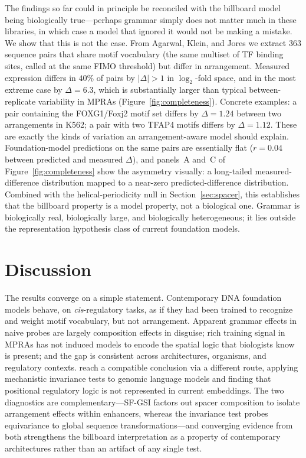 \documentclass{article}
\begin{document}
The findings so far could in principle be reconciled with the billboard model being biologically true---perhaps grammar simply does not matter much in these libraries, in which case a model that ignored it would not be making a mistake. We show that this is not the case. From Agarwal, Klein, and Jores we extract $363$ sequence pairs that share motif vocabulary (the same multiset of TF binding sites, called at the same FIMO threshold) but differ in arrangement. Measured expression differs in $40\%$ of pairs by $|\Delta| > 1$ in $\log_2$-fold space, and in the most extreme case by $\Delta = 6.3$, which is substantially larger than typical between-replicate variability in MPRAs (Figure~\ref{fig:completeness}). Concrete examples: a pair containing the FOXG1/Foxj2 motif set differs by $\Delta = 1.24$ between two arrangements in K562; a pair with two TFAP4 motifs differs by $\Delta = 1.12$. These are exactly the kinds of variation an arrangement-aware model should explain. Foundation-model predictions on the same pairs are essentially flat ($r = 0.04$ between predicted and measured $\Delta$), and panels~A and~C of Figure~\ref{fig:completeness} show the asymmetry visually: a long-tailed measured-difference distribution mapped to a near-zero predicted-difference distribution. Combined with the helical-periodicity null in Section~\ref{sec:spacer}, this establishes that the billboard property is a model property, not a biological one. Grammar is biologically real, biologically large, and biologically heterogeneous; it lies outside the representation hypothesis class of current foundation models.

\section{Discussion}
\label{sec:discussion}

The results converge on a simple statement. Contemporary DNA foundation models behave, on \emph{cis}-regulatory tasks, as if they had been trained to recognize and weight motif vocabulary, but not arrangement. Apparent grammar effects in naive probes are largely composition effects in disguise; rich training signal in MPRAs has not induced models to encode the spatial logic that biologists know is present; and the gap is consistent across architectures, organisms, and regulatory contexts. \citet{cheng2026mit} reach a compatible conclusion via a different route, applying mechanistic invariance tests to genomic language models and finding that positional regulatory logic is not represented in current embeddings. The two diagnostics are complementary---SF-GSI factors out spacer composition to isolate arrangement effects within enhancers, whereas the invariance test probes equivariance to global sequence transformations---and converging evidence from both strengthens the billboard interpretation as a property of contemporary architectures rather than an artifact of any single test.
\end{document}
